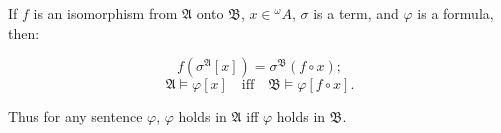 If $f$ is an isomorphism from $\mathfrak{A}$ onto $\mathfrak{B}$, $x \in {}^\omega A$, $\sigma$ is a term, and $\varphi$ is a formula, then:

$$f(\sigma^{\mathfrak{A}}[x]) = \sigma^{\mathfrak{B}}(f \circ x);$$
$$\mathfrak{A} \models \varphi[x] \quad \text{iff} \quad \mathfrak{B} \models \varphi[f \circ x].$$

Thus for any sentence $\varphi$, $\varphi$ holds in $\mathfrak{A}$ iff $\varphi$ holds in $\mathfrak{B}$.
